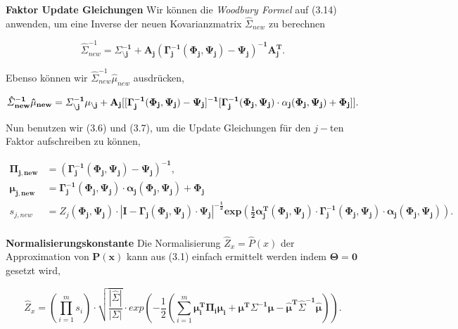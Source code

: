 \documentclass[12pt,a4paper]{scrartcl}
\numberwithin{equation}{section}
\begin{document}
\textbf{Faktor Update Gleichungen} Wir können die \textit{Woodbury Formel} auf (3.14) anwenden, um eine Inverse der neuen Kovarianzmatrix
$ \hat \varSigma_{new}$ zu berechnen

\begin{equation}
  \hat \varSigma_{new}^{-1} = \mathbf{ \varSigma_{\setminus j}^{-1} + A_j(\Gamma_j^{-1}(\Phi_j, \Psi_j)- \Psi_j)^{-1} A_j^T}.
\end{equation}

Ebenso können wir $ \hat \varSigma_{new}^{-1} \hat \mu_{new}$ ausdrücken, 

\begin{equation}
 \mathbf{ \hat \varSigma_{new}^{-1} \hat \mu_{new} = \varSigma_{\setminus j}^{-1} \mu_{\setminus j} + A_j[[\Gamma_j^{-1}(\Phi_j, \Psi_j) - \Psi_j]^{-1} [\Gamma_j^{-1}(\Phi_j, \Psi_j) \cdot \alpha_j(\Phi_j, \Psi_j) + \Phi_j]]. \\ }
\end{equation}

Nun benutzen wir (3.6) und (3.7), um die Update Gleichungen für den $j-$ten Faktor aufschreiben zu können, 

\begin{equation}
 \begin{split}
  \mathbf{\Pi_{j,new}} &= \mathbf{(\Gamma_j^{-1}(\Phi_j, \Psi_j) - \Psi_j)^{-1}}, \\
  \mathbf{\mu_{j, new} } &= \mathbf{\Gamma_j^{-1}(\Phi_j, \Psi_j) \cdot \alpha_j(\Phi_j,\Psi_j) + \Phi_j} \\
  s_{j, new} &= Z_j(\mathbf{\Phi_j, \Psi_j}) \cdot \mathbf{|I - \Gamma_j(\Phi_j, \Psi_j) \cdot \Psi_j|^{-\frac{1}{2}} exp( \frac{1}{2} \alpha_j^T(\Phi_j, \Psi_j) \cdot \Gamma_j^{-1}(\Phi_j, \Psi_j) \cdot \alpha_j(\Phi_j, \Psi_j))}. \\
 \end{split}
\end{equation}

\textbf{Normalisierungskonstante	} Die Normalisierung $ \hat Z_x = \hat P(x)$ der Approximation von $\mathbf{P(x)}$ kann aus (3.1) einfach ermittelt
 werden indem $\mathbf{\Theta = 0}$ gesetzt wird, 
 
\begin{equation}
 \hat Z_x = (\prod_{i = 1}^m s_i) \cdot \sqrt{ \frac{| \hat \varSigma |}{|\varSigma|}} \cdot exp(- \frac{1}{2}( \sum_{i = 1}^m \mathbf{\mu_i^T \Pi_i \mu_i + \mu^T \varSigma^{-1} \mu - \hat \mu^T \hat \varSigma^{-1} \hat \mu} )).
\end{equation}
\end{document}
